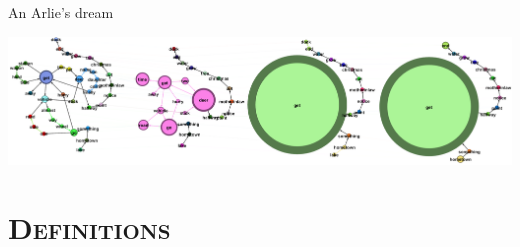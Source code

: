 \documentclass[xcolor=x11names,compress]{beamer}
\begin{document}
{
    \begin{frame}[t]{An Arlie's dream}
        \vspace{-0.2cm}
        
        
        
        
        \begin{minipage}[t]{\textwidth}
            \hspace{-0.7cm}
            \includegraphics[width=1.1\textwidth]{immagini/arlie_80_ml}
        \end{minipage}
    \end{frame}}

\section{\scshape Definitions}
\end{document}
